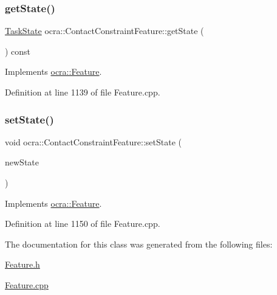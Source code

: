 \hypertarget{classocra_1_1ContactConstraintFeature_a4a156de21fba41f54c2927232173d334}{}\label{classocra_1_1ContactConstraintFeature_a4a156de21fba41f54c2927232173d334} 
\subsubsection{\texorpdfstring{get\+State()}{getState()}}
{\footnotesize\ttfamily \hyperlink{classocra_1_1TaskState}{Task\+State} ocra\+::\+Contact\+Constraint\+Feature\+::get\+State (\begin{DoxyParamCaption}{ }\end{DoxyParamCaption}) const\hspace{0.3cm}{\ttfamily [virtual]}}



Implements \hyperlink{classocra_1_1Feature_a792434ceb793f25874b8fe42ae24c475}{ocra\+::\+Feature}.



Definition at line 1139 of file Feature.\+cpp.

\hypertarget{classocra_1_1ContactConstraintFeature_a1bbc7ca568a64aed7704118b8eeaf6d1}{}\label{classocra_1_1ContactConstraintFeature_a1bbc7ca568a64aed7704118b8eeaf6d1} 
\subsubsection{\texorpdfstring{set\+State()}{setState()}}
{\footnotesize\ttfamily void ocra\+::\+Contact\+Constraint\+Feature\+::set\+State (\begin{DoxyParamCaption}\item[{const \hyperlink{classocra_1_1TaskState}{Task\+State} \&}]{new\+State }\end{DoxyParamCaption})\hspace{0.3cm}{\ttfamily [virtual]}}



Implements \hyperlink{classocra_1_1Feature_ad16d6b176b229280649ab405531e9a30}{ocra\+::\+Feature}.



Definition at line 1150 of file Feature.\+cpp.



The documentation for this class was generated from the following files\+:\begin{DoxyCompactItemize}
\item 
\hyperlink{Feature_8h}{Feature.\+h}\item 
\hyperlink{Feature_8cpp}{Feature.\+cpp}\end{DoxyCompactItemize}
